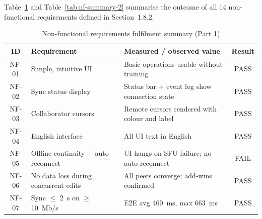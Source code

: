 \documentclass[a4paper,11pt,twoside]{report}
\theoremstyle{definition}
\begin{document}
Table~\ref{tab:nf-summary-1} and Table~\ref{tab:nf-summary-2} summarise the outcome of all 14 non-functional requirements
defined in Section~1.8.2.

\begin{table}[H]
    \centering
    \caption{Non-functional requirements fulfilment summary (Part 1)}
    \begin{tabular}{|c|p{}|p{}|c|}
        \hline
        \textbf{ID} & \textbf{Requirement} & \textbf{Measured / observed value} & \textbf{Result} \\
        \hline
        NF-01 & Simple, intuitive UI & Basic operations usable without training & PASS \\
        \hline
        NF-02 & Sync status display & Status bar + event log show connection state & PASS \\
        \hline
        NF-03 & Collaborator cursors & Remote cursors rendered with colour and label & PASS \\
        \hline
        NF-04 & English interface & All UI text in English & PASS \\
        \hline
        NF-05 & Offline continuity + auto-reconnect & UI hangs on SFU failure; no auto-reconnect & FAIL \\
        \hline
        NF-06 & No data loss during concurrent edits & All peers converge; add-wins confirmed & PASS \\
        \hline
        NF-07 & Sync $\leq$ 2~s on $\geq$ 10~Mb/s & E2E avg 460~ms, max 663~ms & PASS \\
        \hline
    \end{tabular}
    \label{tab:nf-summary-1}
\end{table}
\end{document}
